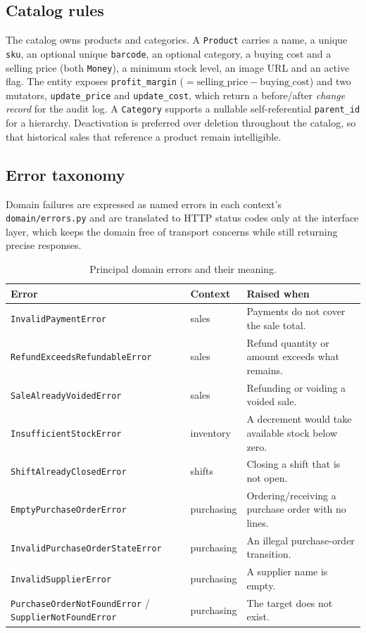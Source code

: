 \documentclass[11pt,a4paper]{article}
\begin{document}
\subsection{Catalog rules}

The catalog owns products and categories. A \texttt{Product} carries a name, a unique \texttt{sku},
an optional unique \texttt{barcode}, an optional category, a buying cost and a selling price (both
\texttt{Money}), a minimum stock level, an image URL and an active flag. The entity exposes
\texttt{profit\_margin} ($= \text{selling\_price} - \text{buying\_cost}$) and two mutators,
\texttt{update\_price} and \texttt{update\_cost}, which return a before/after \emph{change record} for
the audit log. A \texttt{Category} supports a nullable self-referential \texttt{parent\_id} for a
hierarchy. Deactivation is preferred over deletion throughout the catalog, so that historical sales
that reference a product remain intelligible.

\subsection{Error taxonomy}
\label{sec:errors}

Domain failures are expressed as named errors in each context's \texttt{domain/errors.py} and are
translated to HTTP status codes only at the interface layer, which keeps the domain free of
transport concerns while still returning precise responses.

\begin{table}[htbp]\centering
\small
\caption{Principal domain errors and their meaning.}
\begin{tabular}{@{}p{}p{}p{}@{}}
\toprule
\textbf{Error} & \textbf{Context} & \textbf{Raised when} \\
\midrule
\texttt{InvalidPaymentError} & sales & Payments do not cover the sale total. \\
\texttt{RefundExceedsRefundableError} & sales & Refund quantity or amount exceeds what remains. \\
\texttt{SaleAlreadyVoidedError} & sales & Refunding or voiding a voided sale. \\
\texttt{InsufficientStockError} & inventory & A decrement would take available stock below zero. \\
\texttt{ShiftAlreadyClosedError} & shifts & Closing a shift that is not open. \\
\texttt{EmptyPurchaseOrderError} & purchasing & Ordering/receiving a purchase order with no lines. \\
\texttt{InvalidPurchaseOrderStateError} & purchasing & An illegal purchase-order transition. \\
\texttt{InvalidSupplierError} & purchasing & A supplier name is empty. \\
\texttt{PurchaseOrderNotFoundError} / \texttt{SupplierNotFoundError} & purchasing & The target does not
exist. \\
\bottomrule
\end{tabular}
\end{table}
\end{document}

